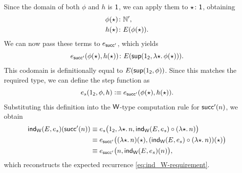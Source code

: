 Since the domain of both $\phi$ and $h$ is $\mathsf{1}$, we can apply them to $\fstar\colon\fun1$, obtaining
\begin{align*}
    \phi(\fstar)&\colon\N',\\
    h(\fstar)&\colon E(\phi(\fstar)).
\end{align*}
We can now pass these terms to $e_{\mathsf{succ}'}$, which yields
\[
    e_{\fun{succ}'}(\phi(\fstar),h(\fstar))
    \colon E(\fun{sup}(1_{\fun2},\lambda{\fstar}.\,\phi(\fstar))).
\]
This codomain is definitionally equal to $E(\mathsf{sup}(1_{\mathsf{2}},\phi))$. Since this matches the required type, we can define the step function as
\begin{equation}\label{eq:e_s-definition}
    e_s(1_{\mathsf{2}},\phi,h)\mathrel{\vcentcolon}\equiv e_{\mathsf{succ}'}
        (\phi({\mathsf{\star}}),h({\mathsf{\star}})).
\end{equation}
Substituting this definition into the $\mathsf{W}$-type computation rule for $\mathsf{succ}'(n)$, we obtain
\begin{align*}
    \mathsf{ind}_{\mathsf{W}}(E,e_s)(\mathsf{succ}'(n))
        &\equiv
            e_s\bigl(
                    1_{\mathsf{2}},
                    \lambda{{\mathsf{\star}}}.\,n,
                    \mathsf{ind}_{\mathsf{W}}(E,e_s)
                        \circ(\lambda{{\mathsf{\star}}}.\,n)
                \bigr)\\
        &\equiv
            e_{\mathsf{succ}'}\bigl(
                    (\lambda{{\mathsf{\star}}}.\,n)({\mathsf{\star}}),
                        (
                            \mathsf{ind}_{\mathsf{W}}(E,e_s)
                            \circ
                            (\lambda{{\mathsf{\star}}}.\,n)
                        )({\mathsf{\star}})
                \bigr)\\
        &\equiv
            e_{\mathsf{succ}'}\bigl(
                    n,
                    \mathsf{ind}_{\mathsf{W}}(E,e_s)(n)
                \bigr),
\end{align*}
which reconstructs the expected recurrence \eqref{eq:ind_W-requirement}.

